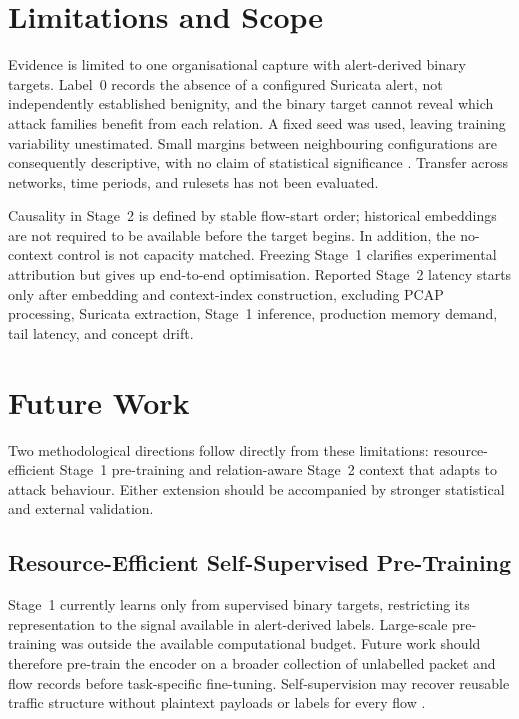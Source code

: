 \documentclass[11pt,fleqn]{report}
\begin{document}
\section{Limitations and Scope}
\label{subsec:conclusion_limitations}

Evidence is limited to one organisational capture with alert-derived binary targets. Label~0 records the absence of a configured Suricata alert, not independently established benignity, and the binary target cannot reveal which attack families benefit from each relation. A fixed seed was used, leaving training variability unestimated. Small margins between neighbouring configurations are consequently descriptive, with no claim of statistical significance \cite{ReimersGurevych2017,Bouthillier2021Variance}. Transfer across networks, time periods, and rulesets has not been evaluated.

Causality in Stage~2 is defined by stable flow-start order; historical embeddings are not required to be available before the target begins. In addition, the no-context control is not capacity matched. Freezing Stage~1 clarifies experimental attribution but gives up end-to-end optimisation. Reported Stage~2 latency starts only after embedding and context-index construction, excluding PCAP processing, Suricata extraction, Stage~1 inference, production memory demand, tail latency, and concept drift.

\section{Future Work}
\label{subsec:conclusion_future_work}

Two methodological directions follow directly from these limitations: resource-efficient Stage~1 pre-training and relation-aware Stage~2 context that adapts to attack behaviour. Either extension should be accompanied by stronger statistical and external validation.

\subsection{Resource-Efficient Self-Supervised Pre-Training}
\label{subsubsec:future_pretraining}

Stage~1 currently learns only from supervised binary targets, restricting its representation to the signal available in alert-derived labels. Large-scale pre-training was outside the available computational budget. Future work should therefore pre-train the encoder on a broader collection of unlabelled packet and flow records before task-specific fine-tuning. Self-supervision may recover reusable traffic structure without plaintext payloads or labels for every flow
\cite{2024MAETraffic,Dong2025EncryptedPretrain}.
\end{document}
